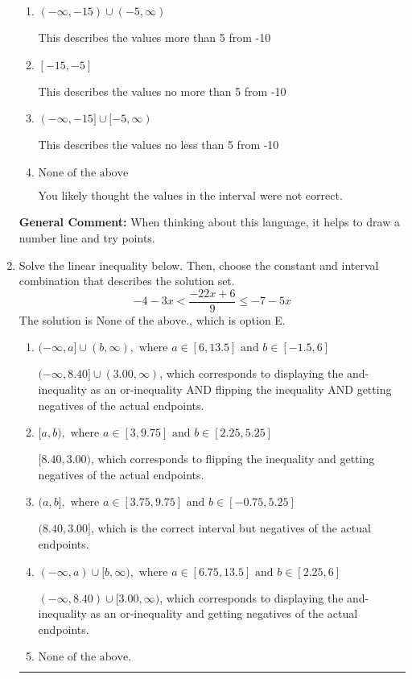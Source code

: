 \documentclass{extbook}[14pt]
\newcommand{\litem}[1]{\item #1

\rule{\textwidth}{0.4pt}}
\begin{document}
\begin{enumerate}
{\begin{enumerate}[label=\Alph*.]
This describes the values less than 5 from -10
\item \( (-\infty, -15) \cup (-5, \infty) \)

This describes the values more than 5 from -10
\item \( [-15, -5] \)

This describes the values no more than 5 from -10
\item \( (-\infty, -15] \cup [-5, \infty) \)

This describes the values no less than 5 from -10
\item \( \text{None of the above} \)

You likely thought the values in the interval were not correct.
\end{enumerate}

\textbf{General Comment:} When thinking about this language, it helps to draw a number line and try points.
}
\litem{
Solve the linear inequality below. Then, choose the constant and interval combination that describes the solution set.
\[ -4 - 3 x < \frac{-22 x + 6}{9} \leq -7 - 5 x \]The solution is \( \text{None of the above.} \), which is option E.\begin{enumerate}[label=\Alph*.]
\item \( (-\infty, a] \cup (b, \infty), \text{ where } a \in [6, 13.5] \text{ and } b \in [-1.5, 6] \)

$(-\infty, 8.40] \cup (3.00, \infty)$, which corresponds to displaying the and-inequality as an or-inequality AND flipping the inequality AND getting negatives of the actual endpoints.
\item \( [a, b), \text{ where } a \in [3, 9.75] \text{ and } b \in [2.25, 5.25] \)

$[8.40, 3.00)$, which corresponds to flipping the inequality and getting negatives of the actual endpoints.
\item \( (a, b], \text{ where } a \in [3.75, 9.75] \text{ and } b \in [-0.75, 5.25] \)

$(8.40, 3.00]$, which is the correct interval but negatives of the actual endpoints.
\item \( (-\infty, a) \cup [b, \infty), \text{ where } a \in [6.75, 13.5] \text{ and } b \in [2.25, 6] \)

$(-\infty, 8.40) \cup [3.00, \infty)$, which corresponds to displaying the and-inequality as an or-inequality and getting negatives of the actual endpoints.
\item \( \text{None of the above.} \)


\end{enumerate}}
\end{enumerate}
\end{document}
